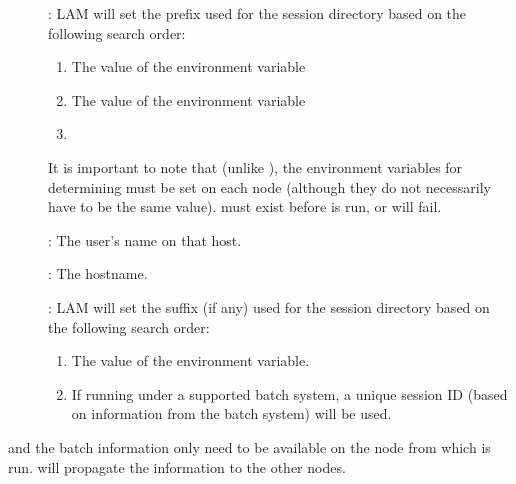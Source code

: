 \begin{description}
\item[]: LAM will set the prefix used for the session
  directory based on the following search order:

  \begin{enumerate}
    \item The value of the 
      environment variable

    \item The value of the  environment variable

    \item {}
  \end{enumerate}
  
  It is important to note that (unlike
  ), the environment
  variables for determining  must be set on each node
  (although they do not necessarily have to be the same value).
   must exist before  is run, or
   will fail.

\item[]: The user's name on that host.

\item[]: The hostname.
  
\item[]: LAM will set the suffix (if any) used
  for the session directory based on the following search order:

  \begin{enumerate}

    \item The value of the 
      environment variable.
  
    \item If running under a supported batch system, a unique session
      ID (based on information from the batch system) will be used.
  \end{enumerate}
\end{description}
  
 and the batch information
only need to be available on the node from which  is
run.   will propagate the information to the other
nodes.


